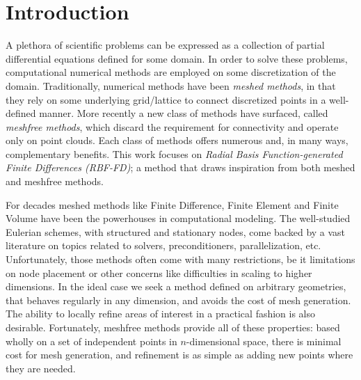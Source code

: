 \documentclass[11pt]{report}
\begin{document}
\fi



\chapter{Introduction}
\label{chap:introduction}

A plethora of scientific problems can be expressed as a collection of partial differential equations defined for some domain. In order to solve these 
problems, computational numerical methods are employed on some discretization of the domain. Traditionally, numerical methods have been \emph{meshed methods}, in that they rely on some underlying grid/lattice to connect discretized points in a well-defined manner. More recently a new class of methods have surfaced, called \emph{meshfree methods}, which discard the requirement for connectivity and operate only on point clouds. Each class of methods offers numerous and, in many ways, complementary benefits. This work focuses on \emph{Radial Basis Function-generated Finite Differences (RBF-FD)}; a method that draws inspiration from both meshed and meshfree methods.



For decades meshed methods like Finite Difference, Finite Element and Finite Volume have been the powerhouses in computational modeling. The well-studied Eulerian schemes, with structured and stationary nodes, come backed by a vast literature on topics related to solvers, preconditioners, parallelization, etc. Unfortunately, those methods often come with many restrictions, be it limitations on node placement or other concerns like difficulties in scaling to higher dimensions. In the ideal case we seek a method defined on arbitrary geometries, that behaves regularly in any dimension, and avoids the cost of 
mesh generation. The ability to locally refine areas of interest in a practical fashion is also desirable. Fortunately, meshfree 
methods provide all of these properties: based wholly on a set of independent points in $n$-dimensional space, 
there is minimal cost for mesh generation, and refinement is as simple as adding new points where 
they are needed. 
\end{document}
